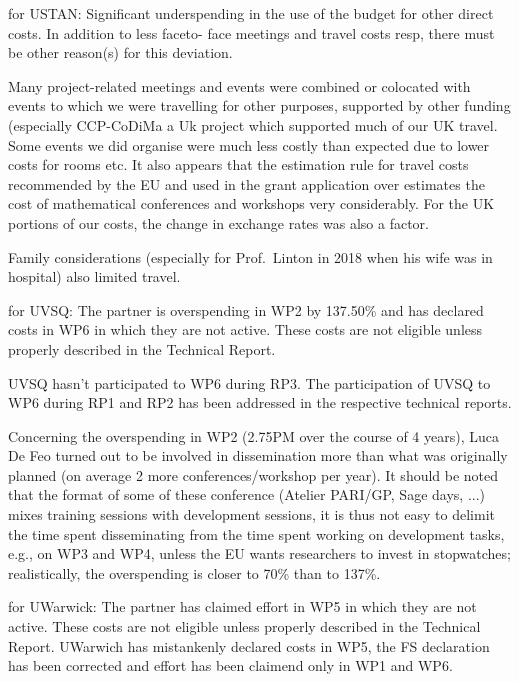 
for USTAN:
Significant underspending in the use of the budget for other direct costs. In addition to less faceto-
face meetings and travel costs resp, there must be other reason(s) for
this deviation.

Many project-related meetings and events were combined or colocated
with events to which we were travelling for other purposes, supported
by other funding (especially CCP-CoDiMa a Uk project which supported
much of our UK travel. Some events we did organise were much less
costly than expected due to lower costs for rooms etc. It also appears
that the  estimation rule for travel costs recommended by the EU and
used in the grant application over estimates the cost of mathematical
conferences and workshops very considerably. For the UK portions of
our costs, the change in exchange rates was also a factor.

Family considerations (especially for Prof.~Linton in 2018 when his
wife was in hospital) also limited travel.




for UVSQ:
The partner is overspending in WP2 by 137.50\% and has declared costs in WP6 in which they
are not active. These costs are not eligible unless properly described in the Technical Report.

UVSQ hasn't participated to WP6 during RP3. The participation of UVSQ
to WP6 during RP1 and RP2 has been addressed in the respective technical reports.

Concerning the overspending in WP2 (2.75PM over the course of 4
years), Luca De Feo turned out to be involved in dissemination more
than what was originally planned (on average 2 more
conferences/workshop per year). It should be noted that the format of
some of these conference (Atelier PARI/GP, Sage days, ...) mixes
training sessions with development sessions, it is thus not easy to
delimit the time spent disseminating from the time spent working on
development tasks, e.g., on WP3 and WP4, unless the EU wants
researchers to invest in stopwatches; realistically, the overspending
is closer to 70\% than to 137\%.

for UWarwick:
The partner has claimed effort in WP5 in which they are not active. These costs are not eligible
unless properly described in the Technical Report.
UWarwich has mistankenly declared costs in WP5, the FS declaration has been corrected and effort has been claimend only in WP1 and WP6. 

